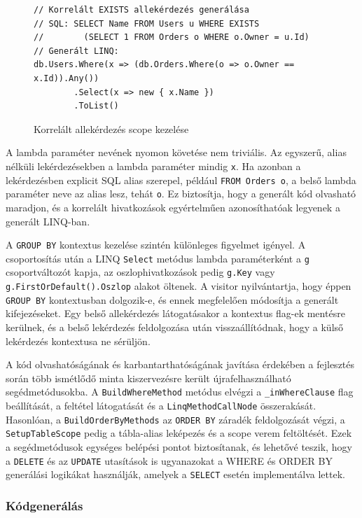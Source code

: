 \documentclass[a4paper,12pt]{article}
\begin{document}
\begin{figure}[H]
\begin{lstlisting}
// Korrelált EXISTS allekérdezés generálása
// SQL: SELECT Name FROM Users u WHERE EXISTS 
//        (SELECT 1 FROM Orders o WHERE o.Owner = u.Id)
// Generált LINQ:
db.Users.Where(x => (db.Orders.Where(o => o.Owner == x.Id)).Any())
        .Select(x => new { x.Name })
        .ToList()
\end{lstlisting}
\caption{Korrelált allekérdezés scope kezelése}
\end{figure}

A lambda paraméter nevének nyomon követése nem triviális. Az egyszerű, alias nélküli lekérdezésekben a lambda paraméter mindig \texttt{x}. Ha azonban a lekérdezésben explicit SQL alias szerepel, például \texttt{FROM Orders o}, a belső lambda paraméter neve az alias lesz, tehát \texttt{o}. Ez biztosítja, hogy a generált kód olvasható maradjon, és a korrelált hivatkozások egyértelműen azonosíthatóak legyenek a generált LINQ-ban.

A \texttt{GROUP BY} kontextus kezelése szintén különleges figyelmet igényel. A csoportosítás után a LINQ \texttt{Select} metódus lambda paraméterként a \texttt{g} csoportváltozót kapja, az oszlophivatkozások pedig \texttt{g.Key} vagy \\\texttt{g.First\-OrDefault().Oszlop} alakot öltenek. A visitor nyilvántartja, hogy éppen \texttt{GROUP BY} kontextusban dolgozik-e, és ennek megfelelően módosítja a generált kifejezéseket. Egy belső allekérdezés látogatásakor a kontextus flag-ek mentésre kerülnek, és a belső lekérdezés feldolgozása után visszaállítódnak, hogy a külső lekérdezés kontextusa ne sérüljön.

A kód olvashatóságának és karbantarthatóságának javítása érdekében a fejlesztés során több ismétlődő minta kiszervezésre került újrafelhasználható segédmetódusokba. A \texttt{BuildWhereMethod} metódus elvégzi a \texttt{\_inWhereClause} flag beállítását, a feltétel látogatását és a \texttt{LinqMethodCallNode} összerakását. Hasonlóan, a \texttt{BuildOrderByMethods} az \texttt{ORDER BY} záradék feldolgozását végzi, a \texttt{SetupTableScope} pedig a tábla-alias leképezés és a scope verem feltöltését. Ezek a segédmetódusok egységes belépési pontot biztosítanak, és lehetővé teszik, hogy a \texttt{DELETE} és az \texttt{UPDATE} utasítások is ugyanazokat a WHERE és ORDER BY generálási logikákat használják, amelyek a \texttt{SELECT} esetén implementálva lettek.

\subsubsection{Kódgenerálás}
\end{document}
